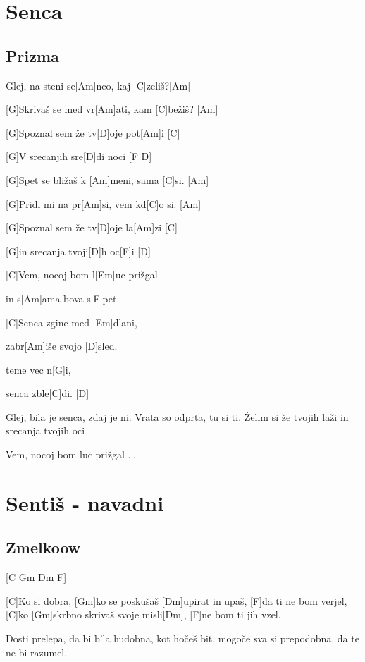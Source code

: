 \documentclass[a4paper,12pt]{article}
\begin{document}
\begin{multicols}{2}
\begin{guitar}
\end{guitar}
\section{Senca}
\subsection*{Prizma}
\begin{guitar}
[G]Glej, na steni se[Am]nco, kaj [C]zeliš?[Am]

[G]Skrivaš se med vr[Am]ati,  kam [C]bežiš? [Am]

[G]Spoznal sem že tv[D]oje pot[Am]i     [C]

[G]V srecanjih   sre[D]di noci [F D]


[G]Spet se bližaš k [Am]meni, sama [C]si. [Am]

[G]Pridi  mi  na  pr[Am]si, vem kd[C]o si. [Am]

[G]Spoznal sem že tv[D]oje la[Am]zi     [C]

[G]in srecanja tvoji[D]h oc[F]i   [D]


[C]Vem, nocoj bom l[Em]uc prižgal

in s[Am]ama bova s[F]pet.

[C]Senca zgine med [Em]dlani,

zabr[Am]iše svojo [D]sled.

teme vec n[G]i,

senca zble[C]di. [D]


Glej, bila je senca, zdaj je ni.
Vrata so odprta, tu si ti.
Želim si že tvojih laži
in srecanja tvojih oci


Vem, nocoj bom luc prižgal ...

\end{guitar}
\section{Sentiš - navadni}
\subsection*{Zmelkoow}
\begin{guitar}

[C Gm Dm F] 

          
[C]Ko si dobra, [Gm]ko se poskušaš [Dm]upirat in upaš,
[F]da ti ne bom verjel,
[C]ko [Gm]skrbno skrivaš svoje misli[Dm],
[F]ne bom ti jih vzel.


Dosti prelepa, da bi b'la hudobna, kot hočeš bit,
mogoče sva si prepodobna, da te ne bi razumel. 



\end{guitar}
\end{multicols}
\end{document}
